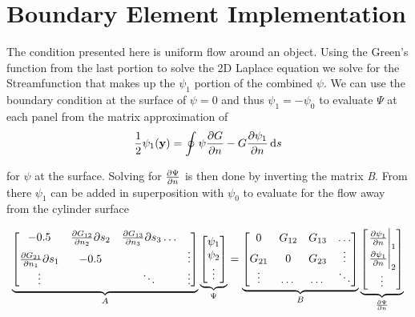 \documentclass{report}
\begin{document}
\chapter{Boundary Element Implementation}

The condition presented here is uniform flow around an object.
Using the Green's function from the last portion to solve the 2D Laplace equation we solve for the Streamfunction that makes up the $\psi_1$ portion of the combined $\psi$.
We can use the boundary condition at the surface of $\psi = 0$ and thus $\psi_1 = -\psi_0$ to evaluate $\Psi$ at each panel from the matrix approximation of
\begin{equation*}
   \frac{1}{2}\psi_1(\vb{y}) = \oint \psi \pdv{G}{n} - G\pdv{\psi_1}{n} \dd{s}
\end{equation*}

for $\psi$ at the surface.
Solving for $\pdv{\Psi}{n}$ is then done by inverting the matrix \emph{B}.
From there $\psi_1$ can be added in superposition with $\psi_0$ to evaluate for the flow away from the cylinder surface

\begin{equation*}
   \underbrace{
   \begin{bmatrix}
      -0.5 & \pdv{G_{12}}{n_2}\partial s_2 & \pdv{G_{13}}{n_3}\partial s_3 \dots \\
      \pdv{G_{21}}{n_1} \partial s_1 & -0.5 & & \vdots \\
      \vdots & & \ddots & \vdots
   \end{bmatrix}
   }_{A}
   \underbrace{
   \begin{bmatrix}
      \psi_1 \\
      \psi_2 \\
      \vdots \\
   \end{bmatrix}
   }_{\Psi}
   =
   \underbrace{
   \begin{bmatrix}
      0 & G_{12} & G_{13} & \dots \\
      G_{21} & 0 & G_{23} & \vdots \\
      \vdots & \dots & \dots & \ddots
   \end{bmatrix}
   }_{B}
   \underbrace{
   \begin{bmatrix}
      \left.\pdv{\psi_1}{n}\right|_1 \\
      \left.\pdv{\psi_1}{n}\right|_2 \\
      \vdots
   \end{bmatrix}
   }_{\pdv{\Psi}{n}}
\end{equation*}
\end{document}
